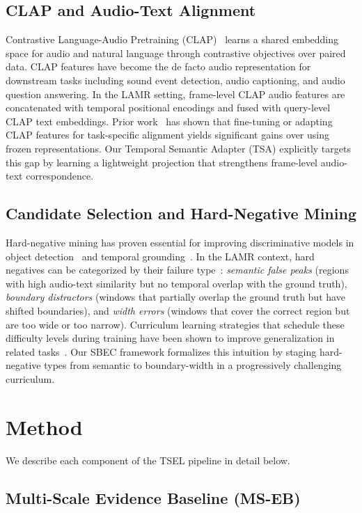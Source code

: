 \documentclass[conference]{IEEEtran}
\begin{document}
\subsection{CLAP and Audio-Text Alignment}
Contrastive Language-Audio Pretraining (CLAP)~\cite{clap} learns a shared
embedding space for audio and natural language through contrastive objectives
over paired data.  CLAP features have become the de facto audio representation
for downstream tasks including sound event detection, audio captioning, and
audio question answering.  In the LAMR setting, frame-level CLAP audio features
are concatenated with temporal positional encodings and fused with query-level
CLAP text embeddings.  Prior work~\cite{clap2023} has shown that fine-tuning or
adapting CLAP features for task-specific alignment yields significant gains
over using frozen representations.  Our Temporal Semantic Adapter (TSA)
explicitly targets this gap by learning a lightweight projection that
strengthens frame-level audio-text correspondence.

\subsection{Candidate Selection and Hard-Negative Mining}
Hard-negative mining has proven essential for improving discriminative models in
object detection~\cite{focal_loss} and temporal grounding~\cite{loe}.  In the
LAMR context, hard negatives can be categorized by their failure
type~\cite{hardneg}: \emph{semantic false peaks} (regions with high audio-text
similarity but no temporal overlap with the ground truth), \emph{boundary
distractors} (windows that partially overlap the ground truth but have shifted
boundaries), and \emph{width errors} (windows that cover the correct region but
are too wide or too narrow).  Curriculum learning strategies that schedule these
difficulty levels during training have been shown to improve generalization in
related tasks~\cite{curriculum}.  Our SBEC framework formalizes this intuition
by staging hard-negative types from semantic to boundary-width in a
progressively challenging curriculum.

\section{Method}
\label{sec:method}

We describe each component of the TSEL pipeline in detail below.

\subsection{Multi-Scale Evidence Baseline (MS-EB)}
\label{sec:ms_eb}
\end{document}
